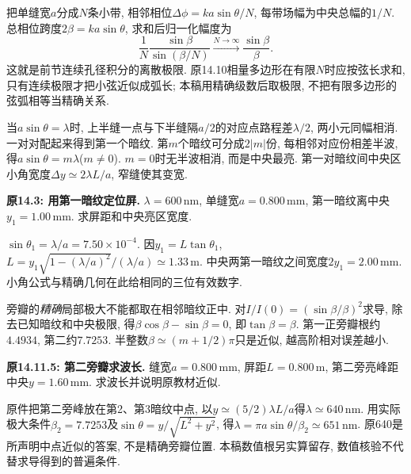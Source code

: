 把单缝宽$a$分成$N$条小带, 相邻相位$\Delta\phi=ka\sin\theta/N$, 每带场幅为中央总幅的$1/N$. 总相位跨度$2\beta=ka\sin\theta$, 求和后归一化幅度为
\[\frac1N\frac{\sin\beta}{\sin(\beta/N)}\xrightarrow{N\to\infty}\frac{\sin\beta}{\beta}.\]
这就是前节连续孔径积分的离散极限. 原14.10相量多边形在有限$N$时应按弦长求和, 只有连续极限才把小弦近似成弧长; 本稿用精确级数后取极限, 不把有限多边形的弦弧相等当精确关系.

\label{tb:single-slit-extrema}
当$a\sin\theta=\lambda$时, 上半缝一点与下半缝隔$a/2$的对应点路程差$\lambda/2$, 两小元同幅相消. 一对对配起来得到第一个暗纹. 第$m$个暗纹可分成$2|m|$份, 每相邻对应份相差半波, 得$a\sin\theta=m\lambda$($m\ne0$). $m=0$时无半波相消, 而是中央最亮. 第一对暗纹间中央区小角宽度$\Delta y\simeq2\lambda L/a$, 窄缝使其变宽.

\begin{example}
\textbf{原14.3: 用第一暗纹定位屏.} $\lambda=600\,\mathrm{nm}$, 单缝宽$a=0.800\,\mathrm{mm}$, 第一暗纹离中央$y_1=1.00\,\mathrm{mm}$. 求屏距和中央亮区宽度.
\end{example}
\begin{solution}
$\sin\theta_1=\lambda/a=7.50\times10^{-4}$. 因$y_1=L\tan\theta_1$, $L=y_1\sqrt{1-(\lambda/a)^2}/(\lambda/a)\simeq1.33\,\mathrm m$. 中央两第一暗纹之间宽度$2y_1=2.00\,\mathrm{mm}$. 小角公式与精确几何在此给相同的三位有效数字.
\end{solution}

旁瓣的\emph{精确}局部极大不能都取在相邻暗纹正中. 对$I/I(0)=(\sin\beta/\beta)^2$求导, 除去已知暗纹和中央极限, 得$\beta\cos\beta-\sin\beta=0$, 即$\tan\beta=\beta$. 第一正旁瓣根约$4.4934$, 第二约$7.7253$. 半整数$\beta\simeq(m+1/2)\pi$只是近似, 越高阶相对误差越小.

\begin{example}
\textbf{原14.11.5: 第二旁瓣求波长.} 缝宽$a=0.800\,\mathrm{mm}$, 屏距$L=0.800\,\mathrm m$, 第二旁亮峰距中央$y=1.60\,\mathrm{mm}$. 求波长并说明原教材近似.
\end{example}
\begin{solution}
原件把第二旁峰放在第2、第3暗纹中点, 以$y\simeq(5/2)\lambda L/a$得$\lambda\simeq640\,\mathrm{nm}$. 用实际极大条件$\beta_2=7.7253$及$\sin\theta=y/\sqrt{L^2+y^2}$, 得$\lambda=\pi a\sin\theta/\beta_2\simeq651\,\mathrm{nm}$. 原640是所声明中点近似的答案, 不是精确旁瓣位置. 本稿数值根另实算留存, 数值核验不代替求导得到的普遍条件.
\end{solution}

